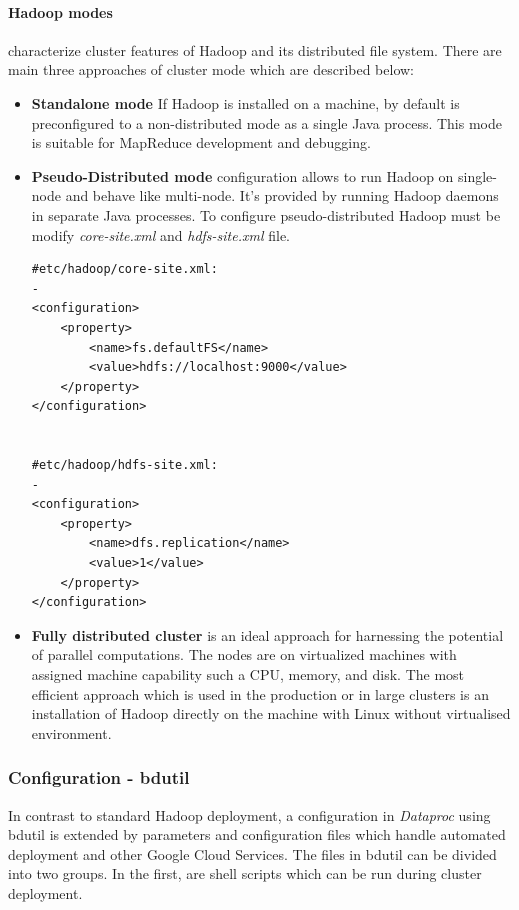 \documentclass[a4paper,12pt,oneside]{report}
\begin{document}
\paragraph{Hadoop modes} characterize cluster features of Hadoop and its distributed file system. 
There are main three approaches of cluster mode which are described below:
\begin{itemize}
\item \textbf{Standalone mode} If Hadoop is installed on a machine, by default is preconfigured to a 
non-distributed mode as a single Java process. This mode  is suitable for MapReduce development and debugging.
\item \textbf{Pseudo-Distributed mode}  configuration allows to run  Hadoop on single-node and behave
 like multi-node. It's provided by running Hadoop daemons in separate Java processes. To configure pseudo-distributed Hadoop must be modify \textit{core-site.xml} and \textit{hdfs-site.xml} file\cite{hadoop_modes}.  


\begin{footnotesize}
\begin{lstlisting}[style=python]
#etc/hadoop/core-site.xml:
-
<configuration>
    <property>
        <name>fs.defaultFS</name>
        <value>hdfs://localhost:9000</value>
    </property>
</configuration>


#etc/hadoop/hdfs-site.xml: 
-
<configuration>
    <property>
        <name>dfs.replication</name>
        <value>1</value>
    </property>
</configuration>
\end{lstlisting}
\end{footnotesize}

\item \textbf{Fully distributed cluster} is an ideal approach for harnessing the potential of
 parallel computations. The nodes are on virtualized machines with assigned machine capability 
 such a CPU, memory, and disk. The most efficient approach which is used in the production or 
 in large clusters is an installation of Hadoop directly on the machine with Linux without virtualised environment.

\end{itemize}


\subsubsection{Configuration - bdutil}
In contrast to standard Hadoop deployment, a configuration in \textit{Dataproc} using bdutil is 
extended by parameters and configuration files which handle automated deployment and other Google
Cloud Services. The files in bdutil can be divided into two groups. In the first,  are shell scripts 
which can be run during cluster deployment.
\end{document}
